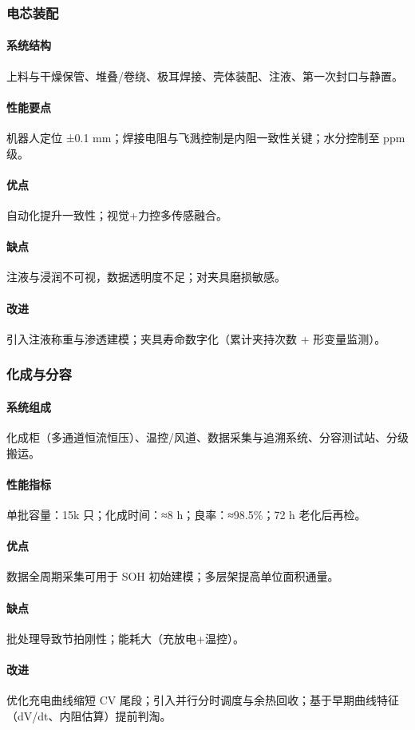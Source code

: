 \subsubsection{电芯装配}
\paragraph{系统结构} 上料与干燥保管、堆叠/卷绕、极耳焊接、壳体装配、注液、第一次封口与静置。\paragraph{性能要点} 机器人定位 ±0.1 mm；焊接电阻与飞溅控制是内阻一致性关键；水分控制至 ppm 级。\paragraph{优点} 自动化提升一致性；视觉+力控多传感融合。\paragraph{缺点} 注液与浸润不可视，数据透明度不足；对夹具磨损敏感。\paragraph{改进} 引入注液称重与渗透建模；夹具寿命数字化（累计夹持次数 + 形变量监测）。

\subsubsection{化成与分容}
\paragraph{系统组成} 化成柜（多通道恒流恒压）、温控/风道、数据采集与追溯系统、分容测试站、分级搬运。\paragraph{性能指标} 单批容量：15k 只；化成时间：≈8 h；良率：≈98.5\%；72 h 老化后再检。\paragraph{优点} 数据全周期采集可用于 SOH 初始建模；多层架提高单位面积通量。\paragraph{缺点} 批处理导致节拍刚性；能耗大（充放电+温控）。\paragraph{改进} 优化充电曲线缩短 CV 尾段；引入并行分时调度与余热回收；基于早期曲线特征（dV/dt、内阻估算）提前判淘。 

